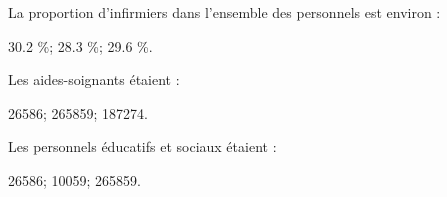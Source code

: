 \begin{questions}
	\question La proportion d'infirmiers dans l'ensemble des personnels est environ :
	
	\begin{oneparcheckboxes}
		\choice \num{30.2} \%;
		\CorrectChoice \num{28.3} \%;
		\choice \num{29.6} \%.
		
	\end{oneparcheckboxes} 

	\question Les aides-soignants étaient :
	
	\begin{oneparcheckboxes}
		\choice \num{26586};
		\choice \num{265859};
		\CorrectChoice \num{187274}.
		
	\end{oneparcheckboxes} 

	\question Les personnels éducatifs et sociaux étaient :
	
	\begin{oneparcheckboxes}
		\choice \num{26586};
		\CorrectChoice \num{10059};
		\choice \num{265859}.
		
	\end{oneparcheckboxes} 
\end{questions}